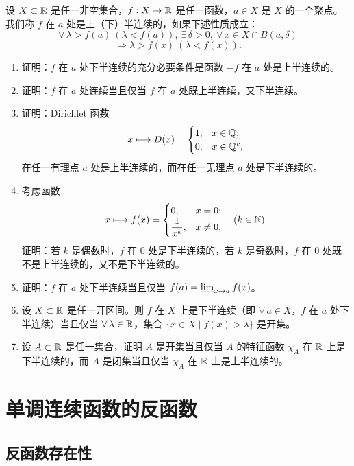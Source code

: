 \begin{exercise}
	\item 设 \(X\subset\mathbb{R}\) 是任一非空集合，\(f:X\to\mathbb{R}\) 是任一函数，\(a\in X\) 是 \(X\) 的一个聚点。我们称 \(f\) 在 \(a\) 处是上（下）半连续的，如果下述性质成立：
	\[
	\forall\,\lambda>f(a)\ (\lambda<f(a)),\ \exists\,\delta>0,\ \forall\,x\in X\cap B(a,\delta)
	\]
	\[
	\Longrightarrow\lambda>f(x)\ (\lambda<f(x)).
	\]
	\begin{enumerate}[label=\arabic*)]
		\item 证明：\(f\) 在 \(a\) 处下半连续的充分必要条件是函数 \(-f\) 在 \(a\) 处是上半连续的。
		\item 证明：\(f\) 在 \(a\) 处连续当且仅当 \(f\) 在 \(a\) 处既上半连续，又下半连续。
		\item 证明：Dirichlet 函数
		\[
		x\longmapsto D(x)=\begin{cases} 1, & x\in\mathbb{Q}; \\ 0, & x\in\mathbb{Q}^c, \end{cases}
		\]
		在任一有理点 \(a\) 处是上半连续的，而在任一无理点 \(a\) 处是下半连续的。
		\item 考虑函数
		\[
		x\longmapsto f(x)=\begin{cases} 0, & x=0; \\ \dfrac1{x^k}, & x\neq0, \end{cases}\quad(k\in\mathbb{N}).
		\]
		证明：若 \(k\) 是偶数时，\(f\) 在 \(0\) 处是下半连续的，若 \(k\) 是奇数时，\(f\) 在 \(0\) 处既不是上半连续的，又不是下半连续的。
		\item 证明：\(f\) 在 \(a\) 处下半连续当且仅当 \(f(a)=\varliminf_{x\to a}f(x)\)。
		\item 设 \(X\subset\mathbb{R}\) 是任一开区间。则 \(f\) 在 \(X\) 上是下半连续（即 \(\forall\,a\in X\)，\(f\) 在 \(a\) 处下半连续）当且仅当 \(\forall\,\lambda\in\mathbb{R}\)，集合 \(\{x\in X\mid f(x)>\lambda\}\) 是开集。
		\item 设 \(A\subset\mathbb{R}\) 是任一集合，证明 \(A\) 是开集当且仅当 \(A\) 的特征函数 \(\chi_A\) 在 \(\mathbb{R}\) 上是下半连续的，而 \(A\) 是闭集当且仅当 \(\chi_A\) 在 \(\mathbb{R}\) 上是上半连续的。
	\end{enumerate}
\end{exercise}

\section{单调连续函数的反函数}

\subsection{反函数存在性}
	\label{sec:4-7-1}

